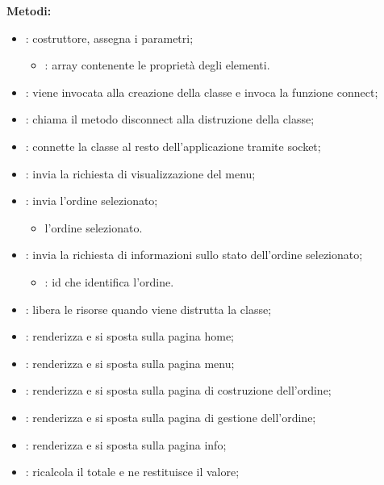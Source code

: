 \textbf{Metodi:}
\begin{itemize}
	\item {}: costruttore, assegna i parametri;
		\begin{itemize}
			\item {}: array contenente le proprietà degli elementi.
		\end{itemize}
	\item {}: viene invocata alla creazione della classe e invoca la funzione connect;
	\item {}: chiama il metodo disconnect alla distruzione della classe;
	\item {}: connette la classe al resto dell'applicazione tramite socket;
	\item {}: invia la richiesta di visualizzazione del menu;
	\item {}: invia l'ordine selezionato;
		\begin{itemize}
			\item {} l'ordine selezionato.
		\end{itemize}
	\item {}: invia la richiesta di informazioni sullo stato dell'ordine selezionato;
		\begin{itemize}
			\item {}: id che identifica l'ordine.
		\end{itemize}
	\item {}: libera le risorse quando viene distrutta la classe;
	\item {}: renderizza e si sposta sulla pagina home;
	\item {}: renderizza e si sposta sulla pagina menu;
	\item {}: renderizza e si sposta sulla pagina di costruzione dell'ordine;
	\item {}: renderizza e si sposta sulla pagina di gestione dell'ordine; 
	\item {}: renderizza e si sposta sulla pagina info;
	\item {}: ricalcola il totale e ne restituisce il valore;

\end{itemize}
